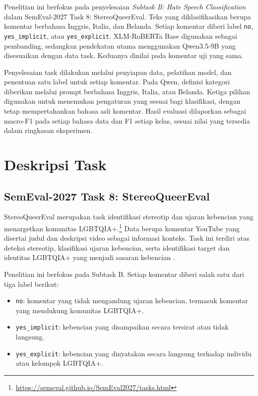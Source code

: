 \documentclass[11pt]{article}
\begin{document}
Penelitian ini berfokus pada penyelesaian \textit{Subtask B: Hate Speech Classification} dalam SemEval-2027 Task 8: StereoQueerEval. Teks yang diklasifikasikan berupa komentar berbahasa Inggris, Italia, dan Belanda. Setiap komentar diberi label \texttt{no}, \texttt{yes\_implicit}, atau \texttt{yes\_explicit}. XLM-RoBERTa Base digunakan sebagai pembanding, sedangkan pendekatan utama menggunakan Qwen3.5-9B yang disesuaikan dengan data task. Keduanya dinilai pada komentar uji yang sama.

Penyelesaian task dilakukan melalui penyiapan data, pelatihan model, dan penentuan satu label untuk setiap komentar. Pada Qwen, definisi kategori diberikan melalui prompt berbahasa Inggris, Italia, atau Belanda. Ketiga pilihan digunakan untuk menemukan pengaturan yang sesuai bagi klasifikasi, dengan tetap mempertahankan bahasa asli komentar. Hasil evaluasi dilaporkan sebagai macro-F1 pada setiap bahasa data dan F1 setiap kelas, sesuai nilai yang tersedia dalam ringkasan eksperimen.

\section{Deskripsi Task}
\subsection{SemEval-2027 Task 8: StereoQueerEval}
\label{sec:task}
StereoQueerEval merupakan task identifikasi stereotip dan ujaran kebencian yang menargetkan komunitas LGBTQIA+.\footnote{\url{https://semeval.github.io/SemEval2027/tasks.html}} Data berupa komentar YouTube yang disertai judul dan deskripsi video sebagai informasi konteks. Task ini terdiri atas deteksi stereotip, klasifikasi ujaran kebencian, serta identifikasi target dan identitas LGBTQIA+ yang menjadi sasaran kebencian \citep{stereoqueereval-2026-data}.

Penelitian ini berfokus pada Subtask B. Setiap komentar diberi salah satu dari tiga label berikut:
\begin{itemize}
    \item \texttt{no}: komentar yang tidak mengandung ujaran kebencian, termasuk komentar yang mendukung komunitas LGBTQIA+.
    \item \texttt{yes\_implicit}: kebencian yang disampaikan secara tersirat atau tidak langsung.
    \item \texttt{yes\_explicit}: kebencian yang dinyatakan secara langsung terhadap individu atau kelompok LGBTQIA+.
\end{itemize}
\end{document}

